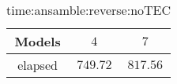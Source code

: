 \begin{table}[!ht]
	\centering
	\begin{tabular}{|c|c|c|}
		\hline
		Models & $4$ & $7$ \\ \hline
		elapsed & $749.72$ & $817.56$ \\ \hline
	\end{tabular}
	\caption{time:ansamble:reverse:noTEC}
	\label{tab:time:ansamble:reverse:noTEC}
\end{table}
